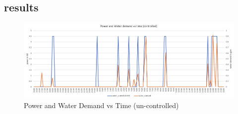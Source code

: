\newpage
\subsection{results}
        \begin{figure}[hbt!]
            \includegraphics[scale=0.4]{Pictures/controlled_WH.png}
            \caption{Power and Water Demand vs Time (un-controlled)}
            \label{fig:uncontrolled_wh}
        \end{figure}

\newpage